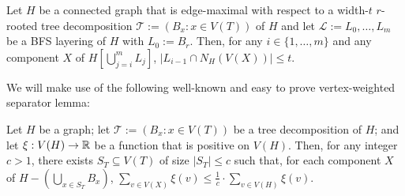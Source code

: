 \documentclass[kpfonts]{patmorin}
\theoremstyle{named}
\begin{document}
\begin{obs}\label{up-neighbours}
    Let $H$ be a connected graph that is edge-maximal with respect to a width-$t$ $r$-rooted tree decomposition $\mathcal{T}:=(B_x:x\in V(T))$ of $H$ and let $\mathcal{L}:=L_0,\ldots,L_m$ be a BFS layering of $H$ with $L_0:=B_r$. Then, for any $i\in\{1,\ldots,m\}$ and any component $X$ of $H[\bigcup_{j=i}^m L_j]$, $|L_{i-1}\cap N_H(V(X))|\le t$.
\end{obs}



We will make use of the following well-known and easy to prove vertex-weighted separator lemma:

\begin{lem}\label{weighted-separator}
    Let $H$ be a graph; let $\mathcal{T}:=(B_x:x\in V(T))$ be a tree decomposition of $H$; and let $\xi:V(H)\to\mathbb{R}$ be a function that is positive on $V(H)$.  Then, for any integer $c>1$, there exists $S_T\subseteq V(T)$ of size $|S_T|\le c$ such that, for each component $X$ of $H-(\bigcup_{x\in S_T} B_x)$, $\sum_{v\in V(X)} \xi(v) \le \tfrac{1}{c}\cdot\sum_{v\in V(H)} \xi(v)$.
\end{lem}

%
\end{document}
